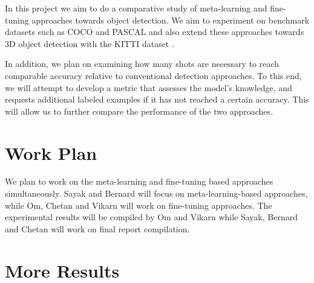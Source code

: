 \documentclass{article}
\begin{document}
{In this project we aim to do a comparative study of meta-learning and fine-tuning approaches 
towards object detection. We aim to experiment on benchmark datasets such as 
COCO \cite{LinMBHPRDZ14} and PASCAL \cite{Everingham10} and also extend these approaches 
towards 3D object detection with the KITTI dataset \cite{Geiger2013IJRR}.

In addition, we plan on examining how many shots are necessary to reach comparable accuracy relative to 
conventional detection approaches. To this end, we will attempt to develop a metric that assesses
the model's knowledge, and requests additional labeled examples if it has not reached a certain accuracy. 
This will allow us to further compare the performance of the two approaches. 

\section{Work Plan}

We plan to work on the meta-learning and fine-tuning based approaches simultaneously. 
Sayak and Bernard will focus on meta-learning-based approaches, while Om, Chetan and Vikarn will work 
on fine-tuning approaches. The experimental results will be compiled by Om and Vikarn while Sayak, 
Bernard and Chetan will work on final report compilation. 
}
\fi 




\clearpage
\appendix

\section{More Results}\label{App}
\end{document}
